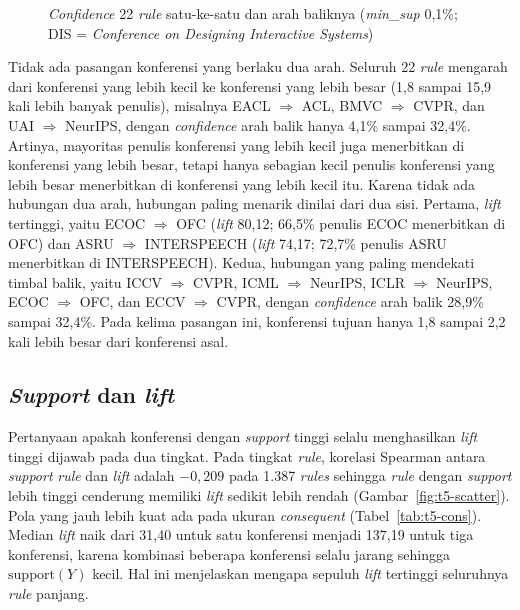 \begin{figure}[ht]
\centering
{}
\caption{\textit{Confidence} 22 \textit{rule} satu-ke-satu dan arah baliknya (\textit{min\_sup} 0,1\%; DIS = \textit{Conference on Designing Interactive Systems})}
\label{fig:t5-arah}
\end{figure}

Tidak ada pasangan konferensi yang berlaku dua arah. Seluruh 22 \textit{rule} mengarah dari konferensi yang lebih kecil ke konferensi yang lebih besar (1,8 sampai 15,9 kali lebih banyak penulis), misalnya EACL $\Rightarrow$ ACL, BMVC $\Rightarrow$ CVPR, dan UAI $\Rightarrow$ NeurIPS, dengan \textit{confidence} arah balik hanya 4,1\% sampai 32,4\%. Artinya, mayoritas penulis konferensi yang lebih kecil juga menerbitkan di konferensi yang lebih besar, tetapi hanya sebagian kecil penulis konferensi yang lebih besar menerbitkan di konferensi yang lebih kecil itu. Karena tidak ada hubungan dua arah, hubungan paling menarik dinilai dari dua sisi. Pertama, \textit{lift} tertinggi, yaitu ECOC $\Rightarrow$ OFC (\textit{lift} 80,12; 66,5\% penulis ECOC menerbitkan di OFC) dan ASRU $\Rightarrow$ INTERSPEECH (\textit{lift} 74,17; 72,7\% penulis ASRU menerbitkan di INTERSPEECH). Kedua, hubungan yang paling mendekati timbal balik, yaitu ICCV $\Rightarrow$ CVPR, ICML $\Rightarrow$ NeurIPS, ICLR $\Rightarrow$ NeurIPS, ECOC $\Rightarrow$ OFC, dan ECCV $\Rightarrow$ CVPR, dengan \textit{confidence} arah balik 28,9\% sampai 32,4\%. Pada kelima pasangan ini, konferensi tujuan hanya 1,8 sampai 2,2 kali lebih besar dari konferensi asal.

\subsection{\textit{Support} dan \textit{lift}}
\label{sec:hasil-t5-lift}
Pertanyaan apakah konferensi dengan \textit{support} tinggi selalu menghasilkan \textit{lift} tinggi dijawab pada dua tingkat. Pada tingkat \textit{rule}, korelasi Spearman antara \textit{support} \textit{rule} dan \textit{lift} adalah $-0{,}209$ pada 1.387 \textit{rules} sehingga \textit{rule} dengan \textit{support} lebih tinggi cenderung memiliki \textit{lift} sedikit lebih rendah (Gambar~\ref{fig:t5-scatter}). Pola yang jauh lebih kuat ada pada ukuran \textit{consequent} (Tabel~\ref{tab:t5-cons}). Median \textit{lift} naik dari 31,40 untuk satu konferensi menjadi 137,19 untuk tiga konferensi, karena kombinasi beberapa konferensi selalu jarang sehingga $\mathrm{support}(Y)$ kecil. Hal ini menjelaskan mengapa sepuluh \textit{lift} tertinggi seluruhnya \textit{rule} panjang.

